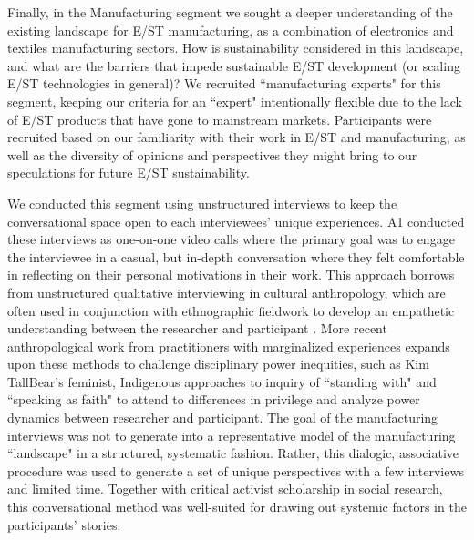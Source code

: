 \documentclass[manuscript,review,anonymous]{acmart}
\begin{document}
Finally, in the Manufacturing segment we sought a deeper understanding of the existing landscape for E/ST manufacturing, as a combination of electronics and textiles manufacturing sectors. How is sustainability considered in this landscape, and what are the barriers that impede sustainable E/ST development (or scaling E/ST technologies in general)? We recruited ``manufacturing experts" for this segment, keeping our criteria for an ``expert" intentionally flexible due to the lack of E/ST products that have gone to mainstream markets. Participants were recruited based on our familiarity with their work in E/ST and manufacturing, as well as the diversity of opinions and perspectives they might bring to our speculations for future E/ST sustainability.

We conducted this segment using unstructured interviews to keep the conversational space open to each interviewees' unique experiences. A1 conducted these interviews as one-on-one video calls where the primary goal was to engage the interviewee in a casual, but in-depth conversation where they felt comfortable in reflecting on their personal motivations in their work. This approach borrows from unstructured qualitative interviewing in cultural anthropology, which are often used in conjunction with ethnographic fieldwork to develop an empathetic understanding between the researcher and participant \cite{fontana_interviewing_2007, gburgess_unstructured_1982}. More recent anthropological work from practitioners with marginalized experiences expands upon these methods to challenge disciplinary power inequities, such as Kim TallBear's feminist, Indigenous approaches to inquiry of ``standing with" and ``speaking as faith" \cite{tallbear_standing_2014} to attend to differences in privilege and analyze power dynamics between researcher and participant. 
The goal of the manufacturing interviews was not to generate into a representative model of the manufacturing ``landscape" in a structured, systematic fashion. Rather, this dialogic, associative procedure was used to generate a set of unique perspectives with a few interviews and limited time. Together with critical activist scholarship in social research, this conversational method was well-suited for drawing out systemic factors in the participants' stories.
\end{document}
